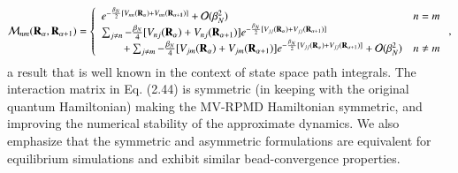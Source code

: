\documentclass[phd,tocprelim]{cornell}
\begin{document}
\begin{equation}
\label{eq:mmatrix} 
\mathcal{M}_{nm}({\bf R}_\alpha, {\bf R}_{\alpha+1}) 
=\left\{
\begin{array}{ll}
 e^{-\frac{\beta_N}{2}
[V_{nn}({{\bf{R}}_{\alpha})
+V_{nn}(\bf{R}_{\alpha+1})]}}
+ \mathcal{O} (\beta_N^2) & n = m\\
\sum_{j\neq n}{-\frac{\beta_N}{4}
[V_{nj}({\bf{R}}_{\alpha})
+V_{nj}({\bf{R}}_{\alpha+1})]e^{-\frac{\beta_N}{2}
[V_{jj}({\bf R}_{\alpha})
+V_{jj}({\bf R}_{\alpha+1})]}} \\
\quad \quad + \sum_{j\neq m}{-\frac{\beta_N}{4}
[V_{jm}({\bf{R}}_{\alpha})
+V_{jm}({\bf{R}}_{\alpha+1})]e^{-\frac{\beta_N}{2}
[V_{jj}({\bf R}_{\alpha})
+V_{jj}({\bf R}_{\alpha+1})]}}+
\mathcal{O} (\beta_N^2) & { n} \neq
{m}
\end{array} \right.,
\end{equation}
a result that is well known 
in the context of state space path integrals.
The interaction matrix in Eq. (2.44)
is symmetric (in keeping with the 
original quantum Hamiltonian) making the MV-RPMD
Hamiltonian symmetric, and improving the numerical 
stability of the approximate dynamics.
We also emphasize that the symmetric and asymmetric
formulations are equivalent for equilibrium simulations 
and exhibit similar bead-convergence properties.
\end{document}
